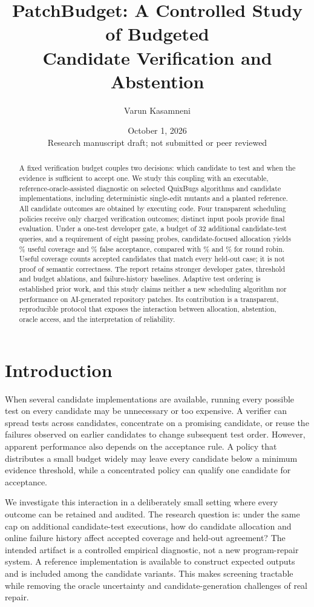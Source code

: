 \documentclass[10pt]{article}
\title{PatchBudget: A Controlled Study of Budgeted\\Candidate Verification and Abstention}
\author{Varun Kasamneni}
\date{October 1, 2026\\\small Research manuscript draft; not submitted or peer reviewed}
\begin{document}
\maketitle
\begin{abstract}
A fixed verification budget couples two decisions: which candidate to test and when the evidence is sufficient to accept one. We study this coupling with an executable, reference-oracle-assisted diagnostic on \ProgramCount{} selected QuixBugs algorithms and \CandidateCount{} candidate implementations, including deterministic single-edit mutants and a planted reference. All candidate outcomes are obtained by executing code. Four transparent scheduling policies receive only charged verification outcomes; distinct input pools provide final evaluation. Under a one-test developer gate, a budget of 32 additional candidate-test queries, and a requirement of eight passing probes, candidate-focused allocation yields \FocusedUseful\% useful coverage and \FocusedFalse\% false acceptance, compared with \RoundRobinUseful\% and \RoundRobinFalse\% for round robin. Useful coverage counts accepted candidates that match every held-out case; it is not proof of semantic correctness. The report retains stronger developer gates, threshold and budget ablations, and failure-history baselines. Adaptive test ordering is established prior work, and this study claims neither a new scheduling algorithm nor performance on AI-generated repository patches. Its contribution is a transparent, reproducible protocol that exposes the interaction between allocation, abstention, oracle access, and the interpretation of reliability.
\end{abstract}

\section{Introduction}
When several candidate implementations are available, running every possible test on every candidate may be unnecessary or too expensive. A verifier can spread tests across candidates, concentrate on a promising candidate, or reuse the failures observed on earlier candidates to change subsequent test order. However, apparent performance also depends on the acceptance rule. A policy that distributes a small budget widely may leave every candidate below a minimum evidence threshold, while a concentrated policy can qualify one candidate for acceptance.

We investigate this interaction in a deliberately small setting where every outcome can be retained and audited. The research question is: under the same cap on additional candidate-test executions, how do candidate allocation and online failure history affect accepted coverage and held-out agreement? The intended artifact is a controlled empirical diagnostic, not a new program-repair system. A reference implementation is available to construct expected outputs and is included among the candidate variants. This makes screening tractable while removing the oracle uncertainty and candidate-generation challenges of real repair.
\end{document}

